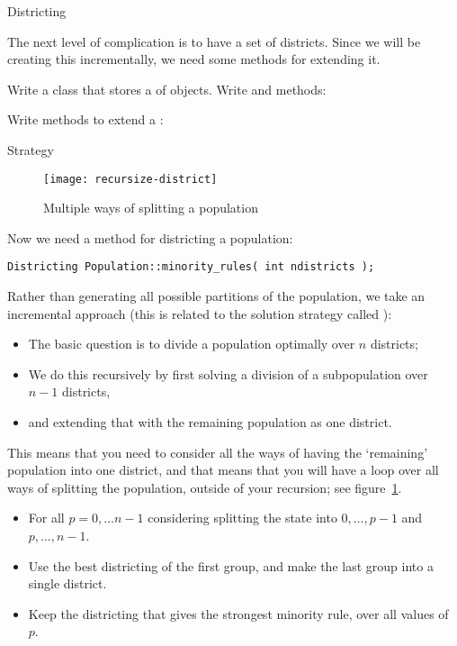  {Districting}

The next level of complication is to have a set of districts.
Since we
will be creating this incrementally, we need some methods for
extending it.

\begin{exercise}
  Write a class  that stores a  of
   objects. Write  and  methods:
\end{exercise}

\begin{exercise}
  Write methods to extend a :
\end{exercise}

 {Strategy}

\begin{figure}[ht]
  \texttt{[image: recursize-district]}
  \caption{Multiple ways of splitting a population}
  \label{fig:recur-district}
\end{figure}

Now we need a method for districting a population:
\begin{lstlisting}
Districting Population::minority_rules( int ndistricts );
\end{lstlisting}
Rather than generating all possible partitions of the population, we
take an incremental approach (this is related to the solution strategy
called ):
\begin{itemize}
\item The basic question is to divide a population optimally over $n$
  districts;
\item We do this recursively by first solving a division of a subpopulation over $n-1$
  districts,
  \item and extending that with the remaining population as one district.
\end{itemize}
This means that you need to consider all the ways of having the
`remaining' population into one district, and that means that you will
have a loop over all ways of splitting the population, outside of your
recursion; see figure~\ref{fig:recur-district}.
\begin{itemize}
\item For all $p=0,\ldots n-1$ considering splitting the state into
  $0,\ldots,p-1$ and $p,\ldots,n-1$.
\item Use the best districting of the first group, and make the last
  group into a single district.
\item Keep the districting that gives the strongest minority rule,
  over all values of~$p$.
\end{itemize}

